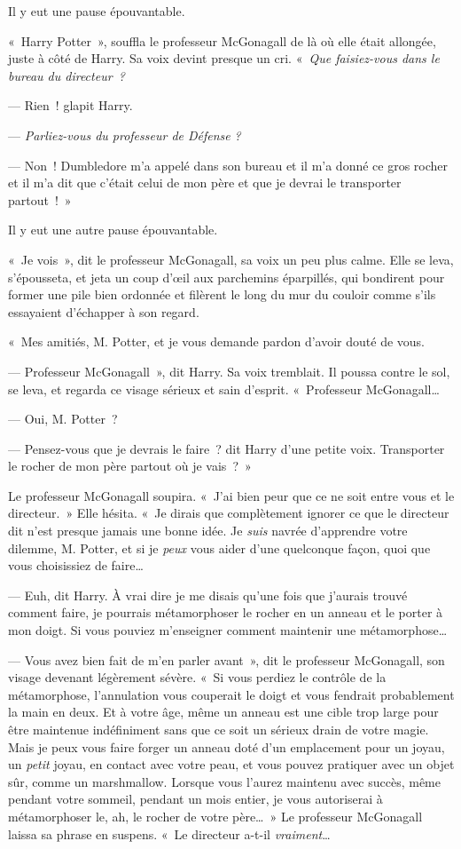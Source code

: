Il y eut une pause épouvantable.

«~Harry Potter~», souffla le professeur McGonagall de là où elle était allongée, juste à côté de Harry.
Sa voix devint presque un cri.
«~\emph{Que faisiez-vous dans le bureau du directeur~?}

--- Rien~! glapit Harry.

--- \emph{Parliez-vous du professeur de Défense} \emph{?}

--- Non~!
Dumbledore m'a appelé dans son bureau et il m'a donné ce gros rocher et il m'a dit que c'était celui de mon père et que je devrai le transporter partout~!~»

Il y eut une autre pause épouvantable.

«~Je vois~», dit le professeur McGonagall, sa voix un peu plus calme.
Elle se leva, s'épousseta, et jeta un coup d'œil aux parchemins éparpillés, qui bondirent pour former une pile bien ordonnée et filèrent le long du mur du couloir comme s'ils essayaient d'échapper à son regard.

«~Mes amitiés, M. Potter, et je vous demande pardon d'avoir douté de vous.

--- Professeur McGonagall~», dit Harry.
Sa voix tremblait.
Il poussa contre le sol, se leva, et regarda ce visage sérieux et sain d'esprit.
«~Professeur McGonagall…

--- Oui, M. Potter~?

--- Pensez-vous que je devrais le faire~? dit Harry d'une petite voix.
Transporter le rocher de mon père partout où je vais~?~»

Le professeur McGonagall soupira.
«~J'ai bien peur que ce ne soit entre vous et le directeur.~»
Elle hésita.
«~Je dirais que complètement ignorer ce que le directeur dit n'est presque jamais une bonne idée.
Je \emph{suis} navrée d'apprendre votre dilemme, M. Potter, et si je \emph{peux} vous aider d'une quelconque façon, quoi que vous choisissiez de faire…

--- Euh, dit Harry.
À vrai dire je me disais qu'une fois que j'aurais trouvé comment faire, je pourrais métamorphoser le rocher en un anneau et le porter à mon doigt.
Si vous pouviez m'enseigner comment maintenir une métamorphose…

--- Vous avez bien fait de m'en parler avant~», dit le professeur McGonagall, son visage devenant légèrement sévère.
«~Si vous perdiez le contrôle de la métamorphose, l'annulation vous couperait le doigt et vous fendrait probablement la main en deux.
Et à votre âge, même un anneau est une cible trop large pour être maintenue indéfiniment sans que ce soit un sérieux drain de votre magie.
Mais je peux vous faire forger un anneau doté d'un emplacement pour un joyau, un \emph{petit} joyau, en contact avec votre peau, et vous pouvez pratiquer avec un objet sûr, comme un marshmallow.
Lorsque vous l'aurez maintenu avec succès, même pendant votre sommeil, pendant un mois entier, je vous autoriserai à métamorphoser le, ah, le rocher de votre père…~»
Le professeur McGonagall laissa sa phrase en suspens.
«~Le directeur a-t-il \emph{vraiment}…


